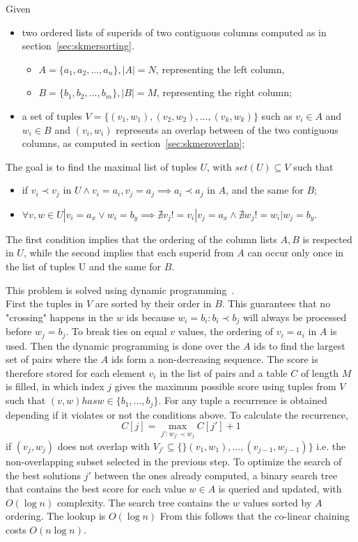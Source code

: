 \begin{definition}
	Given 
	\begin{itemize}
		\item two ordered lists of super\kmer ids of two contiguous columns computed as in section~\ref{sec:skmersorting}.
		\begin{itemize}
			\item $ A = \{a_1, a_2, ..., a_n\}, |A| = N $, representing the left column,
			\item $ B = \{b_1, b_2, ..., b_m\}, |B| = M $, representing the right column;
		\end{itemize}
		\item a set of tuples $ V = \{(v_1,w_1),(v_2,w_2), ..., (v_k,w_k) \}$ such as $ v_i \in A$ and $ w_i \in B$ and $(v_i,w_i)$ represents an overlap between \kmers of the two contiguous columns, as computed in section~\ref{sec:skmeroverlap};
	\end{itemize}
	The goal is to find the maximal list of tuples $ U$, with $set(U) \subseteq V$ such that 
	\begin{itemize}
		\item if $v_i \prec v_j$ in $U \land v_i=a_i, v_j=a_j \implies a_i \prec a_j$ in $A$, and the same for $B$;
		\item $\forall v, w \in U | v_i = a_x \lor w_i = b_y \implies \nexists v_j != v_i | v_j = a_x \land \nexists w_j != w_i | w_j = b_y$.  
	\end{itemize}
	The first condition implies that the ordering of the column lists $A, B$ is respected in $U$, while the second implies that each super\kmer id from $A$ can occur only once in the list of tuples U and the same for $B$.
\end{definition}
This problem is solved using dynamic programming~\cite{genome_scale}.\\
First the tuples in $V$ are sorted by their order in $B$. This guarantees that no "crossing" happens in the $w$ ids because $w_i = b_i: b_i \prec b_j$ will always be processed before $w_j = b_j$. To break ties on equal $v$ values, the ordering of $v_i = a_i$ in $A$ is used. Then the dynamic programming is done over the $A$ ids to find the largest set of pairs where the $A$ ids form a non-decreasing sequence. The score is therefore stored for each element $v_i$ in the list of pairs and a table $C$ of length $M$ is filled, in which index $j$ gives the maximum possible score using tuples from $V$ such that $(v,w) has w \in \{b_1,...,b_j\}$. For any tuple a recurrence is obtained depending if it violates or not the conditions above. To calculate the recurrence, 
\begin{equation} 
C[j] = \max_{j':w_{j'} \prec w_j} C[j'] + 1
\end{equation}
if  $(v_j,w_j)$ does not overlap with $ V_{j'} \subseteq \{\}(v_1,w_1),...,(v_{j-1},w_{j-1})\}$ i.e. the non-overlapping subset selected in the previous step.
To optimize the search of the best solutions $j'$ between the ones already computed, a binary search tree that contains the best score for each value $w \in A$ is queried and updated, with $O(\log{n})$ complexity. The search tree contains the $w$ values sorted by $A$ ordering. The lookup is $O(\log{n})$   From this follows that the co-linear chaining costs $O(n\log{n})$.
